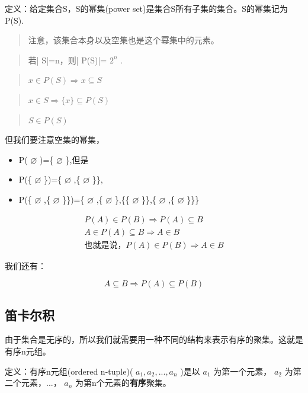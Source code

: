 \documentclass[12pt,a4paper,oneside]{ctexart}
\begin{document}
定义：给定集合S，S的幂集(power set)是集合S所有子集的集合。S的幂集记为P(S).

\begin{quote}
注意，该集合本身以及空集也是这个幂集中的元素。
\end{quote}

\begin{quote}
若| S|=n，则| P(S)|= \(2^n\) .
\end{quote}

\begin{quote}
\(x\in P(S)\Rightarrow x\subseteq S\)
\end{quote}

\begin{quote}
\(x\in S\Rightarrow \{x\}\subseteq P(S)\)
\end{quote}

\begin{quote}
\(S\in P(S)\)
\end{quote}

但我们要注意空集的幂集，

\begin{itemize}
\item
  P( \(\varnothing\) )=\{ \(\varnothing\) \},但是
\item
  P(\{ \(\varnothing\) \})=\{ \(\varnothing\) ,\{ \(\varnothing\) \}\},
\item
  P(\{ \(\varnothing\) ,\{ \(\varnothing\) \}\})=\{ \(\varnothing\) ,\{ \(\varnothing\) \},\{\{ \(\varnothing\) \}\},\{ \(\varnothing\) ,\{ \(\varnothing\) \}\}\}
\end{itemize}

\[\begin{gathered}
P(A)\in P(B)\Rightarrow P(A)\subseteq B\\
A\in P(A)\subseteq B\Rightarrow A\in B\\
\text{也就是说}，P(A)\in P(B)\Rightarrow A\in B
\end{gathered}\]

我们还有：

\[A\subseteq B\Rightarrow P(A)\subseteq P(B)\]

\subsection*{笛卡尔积}

由于集合是无序的，所以我们就需要用一种不同的结构来表示有序的聚集。这就是有序n元组。

定义：有序n元组(ordered n-tuple)( \(a_1,a_2,...,a_n\) )是以 \(a_1\) 为第一个元素， \(a_2\) 为第二个元素，...， \(a_n\) 为第n个元素的\textbf{有序}聚集。
\end{document}

